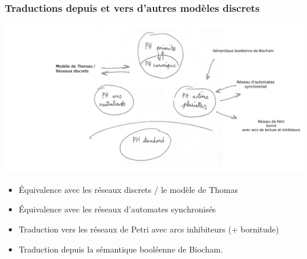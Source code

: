 \begin{frame}[c]
  \frametitle{Traductions depuis et vers d'autres modèles discrets}

\begin{center}
\includegraphics[height=.5\textheight]{figs/PH2.png}
\end{center}

\begin{itemize}
  \item Équivalence avec les réseaux discrets / le modèle de Thomas
  \item Équivalence avec les réseaux d'automates synchronisés
  \item Traduction vers les réseaux de Petri avec arcs inhibiteurs (+ bornitude)
  \item Traduction depuis la sémantique booléenne de Biocham.
\end{itemize}

\end{frame}
